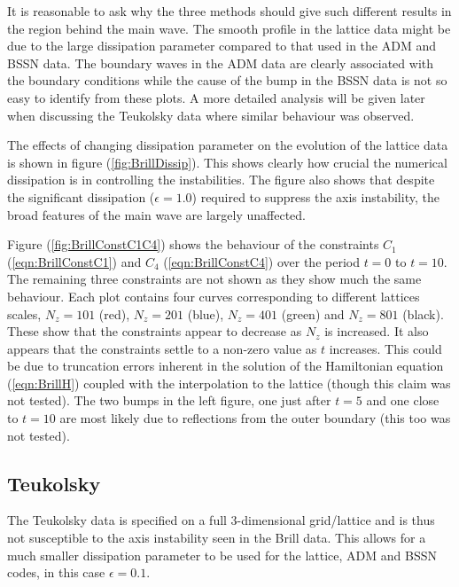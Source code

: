 \documentclass[a4paper,12pt]{article}
\numberwithin{equation}{section}
\begin{document}
It is reasonable to ask why the three methods should give such different results in the
region behind the main wave. The smooth profile in the lattice data might be due to the
large dissipation parameter compared to that used in the ADM and BSSN data. The boundary
waves in the ADM data are clearly associated with the boundary conditions while the cause of
the bump in the BSSN data is not so easy to identify from these plots. A more detailed
analysis will be given later when discussing the Teukolsky data where similar behaviour
was observed.

The effects of changing dissipation parameter on the evolution of the lattice data is shown
in figure (\ref{fig:BrillDissip}). This shows clearly how crucial the numerical dissipation
is in controlling the instabilities. The figure also shows that despite the significant
dissipation ($\epsilon=1.0$) required to suppress the axis instability, the broad features of
the main wave are largely unaffected.

Figure (\ref{fig:BrillConstC1C4}) shows the behaviour of the constraints $C_1$
(\ref{eqn:BrillConstC1}) and $C_4$ (\ref{eqn:BrillConstC4}) over the period $t=0$ to $t=10$.
The remaining three constraints are not shown as they show much the same behaviour. Each plot
contains four curves corresponding to different lattices scales, $N_z=101$ (red), $N_z=201$
(blue), $N_z=401$ (green) and $N_z=801$ (black). These show that the constraints appear to
decrease as $N_z$ is increased. It also appears that the constraints settle to a non-zero
value as $t$ increases. This could be due to truncation errors inherent in the solution of
the Hamiltonian equation (\ref{eqn:BrillH}) coupled with the interpolation to the lattice
(though this claim was not tested). The two bumps in the left figure, one just after $t=5$
and one close to $t=10$ are most likely due to reflections from the outer boundary (this too
was not tested).

\subsection{Teukolsky}
\label{sec:TeukolskyResults}

The Teukolsky data is specified on a full 3-dimensional grid/lattice and is thus not
susceptible to the axis instability seen in the Brill data. This allows for a much smaller
dissipation parameter to be used for the lattice, ADM and BSSN codes, in this case
$\epsilon=0.1$.
\end{document}
